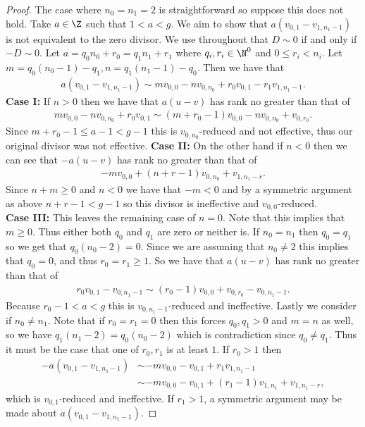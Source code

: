 \begin{proof}
    The case where $n_0 = n_1 = 2$ is straightforward so suppose this does not hold. Take $a \in \Z$ such that $1<a<g$. We aim to show that $a(v_{0,1}-v_{1,n_1-1})$ is not equivalent to the zero divisor. We use throughout that $D \sim 0$ if and only if $-D \sim 0$. Let $a = q_0n_0+r_0 = q_1n_1+r_1$ where $q_i,r_i \in \N^0$ and $0\leq r_i < n_i$. Let $ m = q_0(n_0-1)-q_1, n = q_1(n_1-1)-q_0$. Then we have that
    \begin{align*}
        a(v_{0,1}-v_{1,n_1-1}) \sim mv_{0,0}-nv_{0,n_0}+r_0v_{0,1}-r_1v_{1,n_1-1}.
    \end{align*}
    \textbf{Case I:}
    If $n>0$ then we have that $a(u-v)$ has rank no greater than that of
    \begin{align*}
        mv_{0,0}-nv_{0,n_0}+r_0v_{0,1} \sim (m+r_0-1)v_{0,0}-nv_{0,n_0}+v_{0,r_0}.
    \end{align*}
    Since $m+r_0-1 \leq a - 1 <g-1$ this is $v_{0,n_0}$-reduced and not effective, thus our original divisor was not effective. 
    \textbf{Case II:}
    On the other hand if $n<0$ then we can see that $-a(u-v)$ has rank no greater than that of
    \begin{align*}
        -mv_{0,0} + (n+r-1)v_{0,n_0} + v_{1,n_1-r}.
    \end{align*}
    Since $n+m \geq 0$ and $n<0$ we have that $-m<0$ and by a symmetric argument as above $n+r-1 <g-1$ so this divisor is ineffective and $v_{0,0}$-reduced.\\
    \textbf{Case III:}
    This leaves the remaining case of $n = 0$. Note that this implies that $m\geq 0$. Thus either both $q_0$ and $q_1$ are zero or neither is. If $n_0 = n_1$ then $q_0 = q_1$ so we get that $q_0(n_0-2) = 0$. Since we are assuming that $n_0 \neq 2$ this implies that $q_0 = 0$, and thus $r_0 = r_1\geq 1$. So we have that $a(u-v)$ has rank no greater than that of
    \begin{align*}
        r_0v_{0,1}-v_{0,n_1-1} \sim (r_0-1)v_{0,0}+v_{0,r_0} -v_{0,n_1-1}.
    \end{align*}
    Because $r_0-1 < a<g$ this is $v_{0,n_1-1}$-reduced and ineffective. Lastly we consider if $n_0 \neq n_1$. Note that if $r_0 = r_1 = 0$ then this forces $q_0,q_1>0$ and $m = n$ as well, so we have $q_1(n_1-2) = q_0(n_0-2)$ which is contradiction since $q_0 \neq q_1$. Thus it must be the case that one of $r_0,r_1$ is at least $1$. If $r_0> 1$ then
    \begin{align*}
        -a(v_{0,1}-v_{1,n_1-1}) &\sim -mv_{0,0} -v_{0,1}+r_1v_{1,n_1-1} \\&\sim -mv_{0,0} -v_{0,1}+(r_1-1)v_{1,n_1}+v_{1,n_1-r},
    \end{align*}
    which is $v_{0,1}$-reduced and ineffective. If $r_1>1$, a symmetric argument may be made about $a(v_{0,1}-v_{1,n_1-1})$.
\end{proof}


